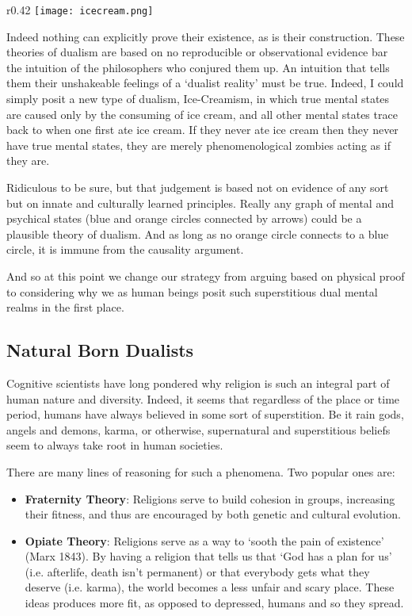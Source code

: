 \documentclass[11pt]{diazessay} %
\begin{document}
		\begin{wrapfigure}{r}{0.42\textwidth} %
			\texttt{[image: icecream.png]}
		\end{wrapfigure}

		Indeed nothing can explicitly prove their existence, as is their construction. These theories of dualism are based on no reproducible or observational evidence bar the intuition of the philosophers who conjured them up. An intuition that tells them their unshakeable feelings of a `dualist reality' must be true. Indeed, I could simply posit a new type of dualism, Ice-Creamism, in which true mental states are caused only by the consuming of ice cream, and all other mental states trace back to when one first ate ice cream. If they never ate ice cream then they never have true mental states, they are merely phenomenological zombies acting as if they are.
		
		Ridiculous to be sure, but that judgement is based not on evidence of any sort but on innate and culturally learned principles. Really any graph of mental and psychical states (blue and orange circles connected by arrows) could be a plausible theory of dualism. And as long as no orange circle connects to a blue circle, it is immune from the causality argument.
		
		And so at this point we change our strategy from arguing based on physical proof to considering why we as human beings posit such superstitious dual mental realms in the first place.

	\subsection{Natural Born Dualists}
		Cognitive scientists have long pondered why religion is such an integral part of human nature and diversity. Indeed, it seems that regardless of the place or time period, humans have always believed in some sort of superstition. Be it rain gods, angels and demons, karma, or otherwise, supernatural and superstitious beliefs seem to always take root in human societies.
	
		There are many lines of reasoning for such a phenomena. Two popular ones are:
		\begin{itemize}
			\item \textbf{Fraternity Theory}: Religions serve to build cohesion in groups, increasing their fitness, and thus are encouraged by both genetic and cultural evolution.
			\item \textbf{Opiate Theory}: Religions serve as a way to `sooth the pain of existence' (Marx 1843). By having a religion that tells us that `God has a plan for us' (i.e. afterlife, death isn't permanent) or that everybody gets what they deserve (i.e. karma), the world becomes a less unfair and scary place. These ideas produces more fit, as opposed to depressed, humans and so they spread.
		\end{itemize}
			
\end{document}
